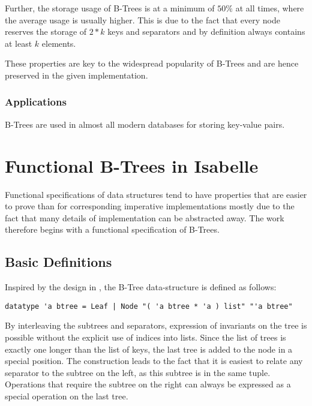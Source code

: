 Further, the storage usage of B-Trees is at a minimum of $50\%$ at all times,
where the average usage is usually higher. \parencite{DBLP:journals/acta/BayerM72}
This is due to the fact that every node reserves the storage of $2*k$ keys and separators
and by definition always contains at least $k$ elements.

These properties are key to the widespread popularity of B-Trees and are
hence preserved in the given implementation.


\subsection{Applications}

B-Trees are used in almost all modern databases for storing key-value pairs.

\chapter{Functional B-Trees in Isabelle}

Functional specifications of data structures tend to have properties that
are easier to prove than for corresponding imperative implementations
mostly due to the fact that many details of implementation can be abstracted away.
The work therefore begins with a functional specification of B-Trees.

\section{Basic Definitions}

Inspired by the design in \parencite{DBLP:conf/popl/MalechaMSW10}, the B-Tree data-structure is defined as follows:

\begin{lstlisting}[mathescape=true, language=Isabelle]
datatype 'a btree = Leaf | Node "( 'a btree * 'a ) list" "'a btree"
\end{lstlisting}

By interleaving the subtrees and separators, expression of invariants
on the tree is possible without the explicit use of indices into lists.
Since the list of trees is exactly one longer than the list of keys,
the last tree is added to the node in a special position.
The construction leads to the fact that it is easiest to relate any separator
to the subtree on the left, as this subtree is in the same tuple.
Operations that require the subtree on the right can always be expressed as a special
operation on the last tree.

